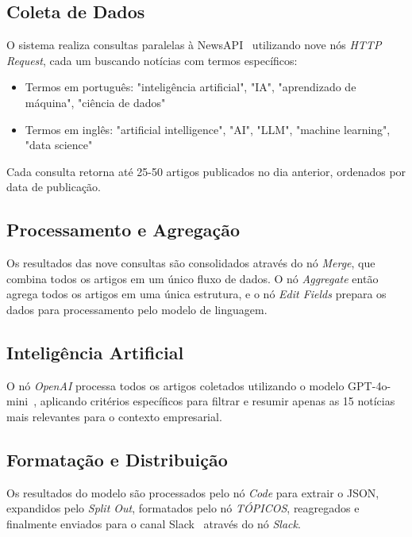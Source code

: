 \documentclass{sftex}
\begin{document}
\subsection{Coleta de Dados}
O sistema realiza consultas paralelas à NewsAPI~\cite{newsapi} utilizando nove nós \textit{HTTP Request}, cada um buscando notícias com termos específicos:
\begin{itemize}
    \item Termos em português: "inteligência artificial", "IA", "aprendizado de máquina", "ciência de dados"
    \item Termos em inglês: "artificial intelligence", "AI", "LLM", "machine learning", "data science"
\end{itemize}

Cada consulta retorna até 25-50 artigos publicados no dia anterior, ordenados por data de publicação.

\subsection{Processamento e Agregação}
Os resultados das nove consultas são consolidados através do nó \textit{Merge}, que combina todos os artigos em um único fluxo de dados. O nó \textit{Aggregate} então agrega todos os artigos em uma única estrutura, e o nó \textit{Edit Fields} prepara os dados para processamento pelo modelo de linguagem.

\subsection{Inteligência Artificial}
O nó \textit{OpenAI} processa todos os artigos coletados utilizando o modelo GPT-4o-mini~\cite{openai_gpt4o_mini}, aplicando critérios específicos para filtrar e resumir apenas as 15 notícias mais relevantes para o contexto empresarial.

\subsection{Formatação e Distribuição}
Os resultados do modelo são processados pelo nó \textit{Code} para extrair o JSON, expandidos pelo \textit{Split Out}, formatados pelo nó \textit{TÓPICOS}, reagregados e finalmente enviados para o canal Slack~\cite{slack_platform} através do nó \textit{Slack}.
\end{document}
